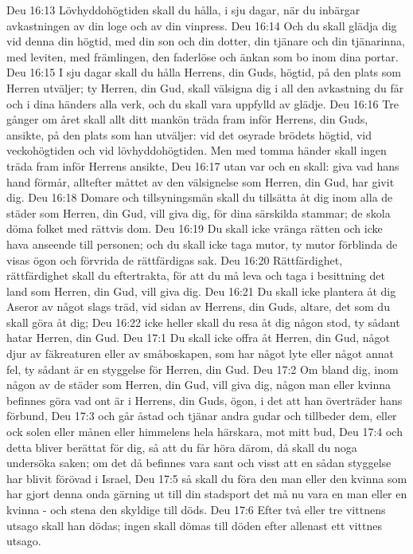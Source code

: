 Deu 16:13  Lövhyddohögtiden skall du hålla, i sju dagar, när du inbärgar avkastningen av din loge och av din vinpress.
Deu 16:14  Och du skall glädja dig vid denna din högtid, med din son och din dotter, din tjänare och din tjänarinna, med leviten, med främlingen, den faderlöse och änkan som bo inom dina portar.
Deu 16:15  I sju dagar skall du hålla Herrens, din Guds, högtid, på den plats som Herren utväljer; ty Herren, din Gud, skall välsigna dig i all den avkastning du får och i dina händers alla verk, och du skall vara uppfylld av glädje.
Deu 16:16  Tre gånger om året skall allt ditt mankön träda fram inför Herrens, din Guds, ansikte, på den plats som han utväljer: vid det osyrade brödets högtid, vid veckohögtiden och vid lövhyddohögtiden. Men med tomma händer skall ingen träda fram inför Herrens ansikte,
Deu 16:17  utan var och en skall: giva vad hans hand förmår, alltefter måttet av den välsignelse som Herren, din Gud, har givit dig.
Deu 16:18  Domare och tillsyningsmän skall du tillsätta åt dig inom alla de städer som Herren, din Gud, vill giva dig, för dina särskilda stammar; de skola döma folket med rättvis dom.
Deu 16:19  Du skall icke vränga rätten och icke hava anseende till personen; och du skall icke taga mutor, ty mutor förblinda de visas ögon och förvrida de rättfärdigas sak.
Deu 16:20  Rättfärdighet, rättfärdighet skall du eftertrakta, för att du må leva och taga i besittning det land som Herren, din Gud, vill giva dig.
Deu 16:21  Du skall icke plantera åt dig Aseror av något slags träd, vid sidan av Herrens, din Guds, altare, det som du skall göra åt dig;
Deu 16:22  icke heller skall du resa åt dig någon stod, ty sådant hatar Herren, din Gud.
Deu 17:1  Du skall icke offra åt Herren, din Gud, något djur av fäkreaturen eller av småboskapen, som har något lyte eller något annat fel, ty sådant är en styggelse för Herren, din Gud.
Deu 17:2  Om bland dig, inom någon av de städer som Herren, din Gud, vill giva dig, någon man eller kvinna befinnes göra vad ont är i Herrens, din Guds, ögon, i det att han överträder hans förbund,
Deu 17:3  och går åstad och tjänar andra gudar och tillbeder dem, eller ock solen eller månen eller himmelens hela härskara, mot mitt bud,
Deu 17:4  och detta bliver berättat för dig, så att du får höra därom, då skall du noga undersöka saken; om det då befinnes vara sant och visst att en sådan styggelse har blivit förövad i Israel,
Deu 17:5  så skall du föra den man eller den kvinna som har gjort denna onda gärning ut till din stadsport det må nu vara en man eller en kvinna - och stena den skyldige till döds.
Deu 17:6  Efter två eller tre vittnens utsago skall han dödas; ingen skall dömas till döden efter allenast ett vittnes utsago.
